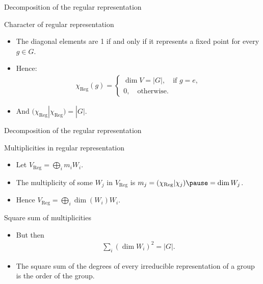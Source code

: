 \documentclass[10pt]{beamer}
\newcommand{\Reg}{\text{Reg}}
\begin{document}
	\begin{frame}{Decomposition of the regular representation}
		\begin{block}{Character of regular representation}
			\begin{itemize}
			
			
			\item The diagonal elements are 1 if and only if it represents a fixed point for every $g \in G$.\pause
			
			
			\item Hence: 
			\begin{align*}
				\chi_\Reg(g) = \begin{cases}
					\dim V = |G|, \quad \text{if $g=e$},\\
					0, \quad \text{otherwise}.
				\end{cases}
			\end{align*}\pause
			
			\item And $(\chi_\Reg|\chi_\Reg) = |G|$.
			
			
		\end{itemize}
		\end{block}
%		
	\end{frame}
	\begin{frame}{Decomposition of the regular representation}
		\begin{block}{Multiplicities in regular representation}
			\begin{itemize}
				\item Let $ V_\Reg = \bigoplus_i m_i W_i$.\pause
				
				\item The multiplicity of some $W_j$ in $V_\Reg$ is $m_j = (\chi_\Reg|\chi_j) \pause = \dim W_j$.\pause
				
				\item Hence $V_\Reg = \bigoplus_i \dim(W_i)W_i$.
			\end{itemize}
		\end{block}\pause
		\begin{block}{Square sum of multiplicities}
						\begin{itemize}
								\item But then \begin{align*}
										\sum_i (\dim W_i)^2 = |G|.
									\end{align*}
								\item The square sum of the degrees of every irreducible representation of a group is the order of the group.
							\end{itemize}
					\end{block}
		
	\end{frame}
	
\end{document}
